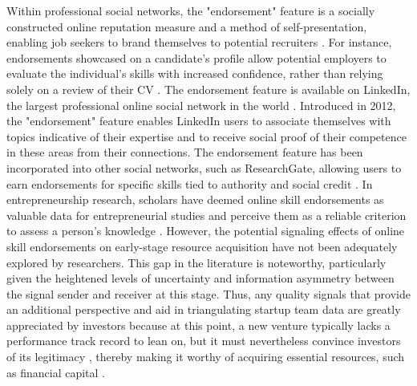 \documentclass[12pt]{article}
\begin{document}
Within professional social networks, the "endorsement" feature is a socially constructed online reputation measure and a method of self-presentation, enabling job seekers to brand themselves to potential recruiters \citep{rapanta2017linkedin}. For instance, endorsements showcased on a candidate's profile allow potential employers to evaluate the individual's skills with increased confidence, rather than relying solely on a review of their CV \citep{drakopoulos2020building, perez2016endorsement, yan2019social}. The endorsement feature is available on LinkedIn, the largest professional online social network in the world \citep{wu2018analysis}. Introduced in 2012, the "endorsement" feature enables LinkedIn users to associate themselves with topics indicative of their expertise and to receive social proof of their competence in these areas from their connections. The endorsement feature has been incorporated into other social networks, such as ResearchGate, allowing users to earn endorsements for specific skills tied to authority and social credit \citep{perez2016endorsement, wu2018analysis}. In entrepreneurship research, scholars have deemed online skill endorsements as valuable data for entrepreneurial studies and perceive them as a reliable criterion to assess a person's knowledge \citep{reese2020should, sako2020scaling}. However, the potential signaling effects of online skill endorsements on early-stage resource acquisition have not been adequately explored by researchers. This gap in the literature is noteworthy, particularly given the heightened levels of uncertainty \citep{matusik2008values} and information asymmetry between the signal sender and receiver \citep{spence2002signaling} at this stage. Thus, any quality signals that provide an additional perspective and aid in triangulating startup team data are greatly appreciated by investors because at this point, a new venture typically lacks a performance track record to lean on, but it must nevertheless convince investors of its legitimacy \citep{becker2015new}, thereby making it worthy of acquiring essential resources, such as financial capital \citep{ko2018signaling}.
\end{document}
